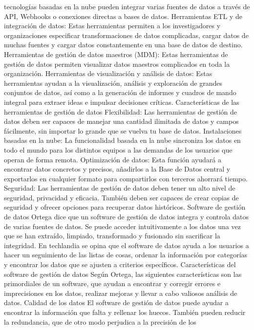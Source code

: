 \documentclass[
  letterpaper,
  DIV=11,
  numbers=noendperiod]{scrreprt}
\begin{document}
tecnologías basadas en la nube pueden integrar varias fuentes de datos a
través de API, Webhooks o conexiones directas a bases de datos.
Herramientas ETL y de integración de datos: Estas herramientas permiten
a los investigadores y organizaciones especificar transformaciones de
datos complicadas, cargar datos de muchas fuentes y cargar datos
constantemente en una base de datos de destino. Herramientas de gestión
de datos maestros (MDM): Estas herramientas de gestión de datos permiten
visualizar datos maestros complicados en toda la organización.
Herramientas de visualización y análisis de datos: Estas herramientas
ayudan a la visualización, análisis y exploración de grandes conjuntos
de datos, así como a la generación de informes y cuadros de mando
integral para extraer ideas e impulsar decisiones críticas.
Características de las herramientas de gestión de datos Flexibilidad:
Las herramientas de gestión de datos deben ser capaces de manejar una
cantidad ilimitada de datos y campos fácilmente, sin importar lo grande
que se vuelva tu base de datos. Instalaciones basadas en la nube: La
funcionalidad basada en la nube sincroniza los datos en todo el mundo
para los distintos equipos a las demandas de los usuarios que operan de
forma remota. Optimización de datos: Esta función ayudará a encontrar
datos concretos y precisos, añadirlos a la Base de Datos central y
exportarlos en cualquier formato para compartirlos con terceros ahorrará
tiempo. Seguridad: Las herramientas de gestión de datos deben tener un
alto nivel de seguridad, privacidad y eficacia. También deben ser
capaces de crear copias de seguridad y ofrecer opciones para recuperar
datos históricos. Software de gestión de datos Ortega dice que un
software de gestión de datos integra y controla datos de varias fuentes
de datos. Se puede acceder intuitivamente a los datos una vez que se han
extraído, limpiado, transformado y fusionado sin sacrificar la
integridad. En techlandia se opina que el software de datos ayuda a los
usuarios a hacer un seguimiento de las listas de cosas, ordenar la
información por categorías y encontrar los datos que se ajusten a
criterios específicos. Características del software de gestión de datos
Según Ortega, las siguientes características son las primordiales de un
software, que ayudan a encontrar y corregir errores e imprecisiones en
los datos, realizar mejoras y llevar a cabo valiosos análisis de datos.
Calidad de los datos El software de gestión de datos puede ayudar a
encontrar la información que falta y rellenar los huecos. También pueden
reducir la redundancia, que de otro modo perjudica a la precisión de los
\end{document}
